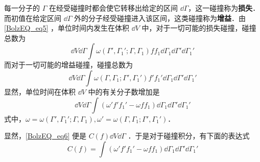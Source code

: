  每一分子的 $\Gamma$ 在经受碰撞时都会使它转移出给定的区间 $\dd\Gamma$，这一碰撞称为\textbf{损失}．而初值在给定区间 $\dd \Gamma$ 外的分子经受碰撞进入该区间，这类碰撞称为\textbf{增益}．由\autoref{BolzEQ_eq5} ，单位时间内发生在体积 $\dd V$ 中，对于一切可能的损失碰撞，碰撞总数为
 \begin{equation}
 \dd V\dd \Gamma\int\omega(\Gamma',\Gamma_1';\Gamma,\Gamma_1)ff_1\dd\Gamma_1\dd\Gamma'\dd\Gamma_1'
 \end{equation}
  而对于一切可能的增益碰撞，碰撞总数为
  \begin{equation}
  \dd V\dd \Gamma\int\omega(\Gamma,\Gamma_1;\Gamma',\Gamma_1')f'f_1'\dd\Gamma_1\dd\Gamma'\dd\Gamma_1'
  \end{equation}
  显然，单位时间在体积 $\dd V$ 中的有关分子数增加是
  \begin{equation}\label{BolzEQ_eq6}
  \dd V\dd \Gamma\int(\omega'f'f_1'-\omega f f_1)\dd\Gamma_1\dd\Gamma'\dd\Gamma_1'
  \end{equation}
  式中，$\omega=\omega(\Gamma',\Gamma_1';\Gamma,\Gamma_1),\omega'=\omega(\Gamma,\Gamma_1;\Gamma',\Gamma_1')$．

显然，\autoref{BolzEQ_eq6} 便是 $C(f)\dd V\dd\Gamma$ ．于是对于碰撞积分，有下面的表达式
\begin{equation}
C(f)=\int(\omega'f'f_1'-\omega f f_1)\dd\Gamma_1\dd\Gamma'\dd\Gamma_1'
\end{equation}
